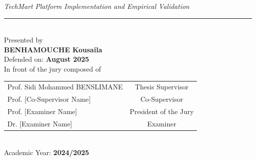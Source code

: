 \begin{center}
{\normalsize \textit{TechMart Platform Implementation and Empirical Validation}} \\[0.25cm]

\rule{14cm}{0.5pt} \\[0.35cm]

{\small Presented by} \\[0.12cm]
{\large \textbf{BENHAMOUCHE Kousaila}} \\[0.25cm]

{\small Defended on: \textbf{August 2025}} \\[0.12cm]
{\small In front of the jury composed of} \\[0.25cm]

{\small
\begin{tabular}{lc}
Prof. Sidi Mohammed BENSLIMANE & Thesis Supervisor \\
Prof. [Co-Supervisor Name] & Co-Supervisor \\
Prof. [Examiner Name] & President of the Jury \\
Dr. [Examiner Name] & Examiner \\
\end{tabular}} \\[0.35cm]

{\small Academic Year: \textbf{2024/2025}}

\end{center}

\restoregeometry
\newpage